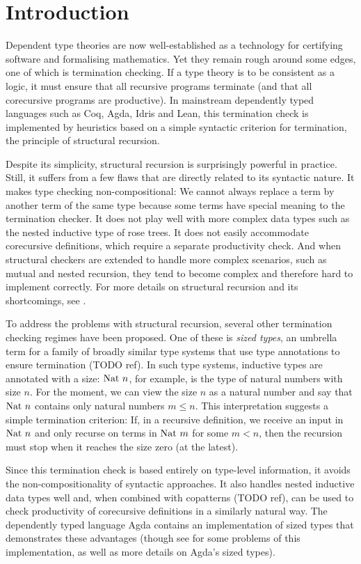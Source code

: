 \chapter{Introduction}

Dependent type theories are now well-established as a technology for certifying
software and formalising mathematics. Yet they remain rough around some edges,
one of which is termination checking. If a type theory is to be consistent as a
logic, it must ensure that all recursive programs terminate (and that all
corecursive programs are productive). In mainstream dependently typed languages
such as Coq, Agda, Idris and Lean, this termination check is implemented by
heuristics based on a simple syntactic criterion for termination, the principle
of structural recursion.

Despite its simplicity, structural recursion is surprisingly powerful in
practice. Still, it suffers from a few flaws that are directly related to its
syntactic nature. It makes type checking non-compositional: We cannot always
replace a term by another term of the same type because some terms have special
meaning to the termination checker. It does not play well with more complex data
types such as the nested inductive type of rose trees. It does not easily
accommodate corecursive definitions, which require a separate productivity
check. And when structural checkers are extended to handle more complex
scenarios, such as mutual and nested recursion, they tend to become complex and
therefore hard to implement correctly. For more details on structural recursion
and its shortcomings, see .

To address the problems with structural recursion, several other termination
checking regimes have been proposed. One of these is \emph{sized types}, an
umbrella term for a family of broadly similar type systems that use type
annotations to ensure termination (TODO ref). In such type systems, inductive
types are annotated with a size: $\mathrm{Nat}~n$, for example, is the type of natural
numbers with size $n$. For the moment, we can view the size $n$ as a natural
number and say that $\mathrm{Nat}~n$ contains only natural numbers $m ≤ n$. This
interpretation suggests a simple termination criterion: If, in a recursive
definition, we receive an input in $\mathrm{Nat}~n$ and only recurse on terms in
$\mathrm{Nat}~m$ for some $m < n$, then the recursion must stop when it reaches the
size zero (at the latest).

Since this termination check is based entirely on type-level information, it
avoids the non-compositionality of syntactic approaches. It also handles nested
inductive data types well and, when combined with copatterns (TODO ref), can be
used to check productivity of corecursive definitions in a similarly natural
way. The dependently typed language Agda contains an implementation of sized
types that demonstrates these advantages (though see 
for some problems of this implementation, as well as more details on Agda's
sized types).

